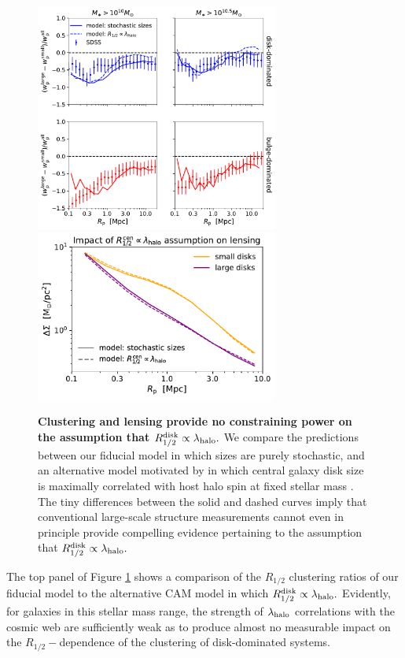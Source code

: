 \documentclass[usenatbib,usegraphicx,letterpaper]{mn2e}
\newcommand{\rhalf}{R_{1/2}}
\newcommand{\rhalfdisk}{R_{1/2}^{\rm disk}}
\newcommand{\halospin}{\lambda_{\rm halo}}
\begin{document}
\begin{figure}
\centering
\includegraphics[width=8cm]{FIGS/size_clustering_ratios_bt_decomposition_spin_size_correlation.pdf}
\includegraphics[width=8cm]{FIGS/central_lensing_spin_size_correlation.pdf}
\caption{
{\bf Clustering and lensing provide no constraining power on the assumption that $\rhalfdisk\propto\halospin.$}
We compare the predictions between our fiducial model in which sizes are purely stochastic, and an alternative model motivated by \citet{mo_mao_white98} in which central galaxy disk size is maximally correlated with host halo spin at fixed stellar mass \citep[implemented via conditional abundance matching, e.g.,][]{hearin_etal13b}. The tiny differences between the solid and dashed curves imply that conventional large-scale structure measurements cannot even in principle provide compelling evidence pertaining to the assumption that $\rhalfdisk\propto\halospin.$
}
\label{fig:halospin_lensing}
\end{figure}

The top panel of Figure \ref{fig:halospin_lensing} shows a comparison of the $\rhalf$ clustering ratios of our fiducial model to the alternative CAM model in which $\rhalfdisk\propto\halospin.$ Evidently, for galaxies in this stellar mass range, the strength of $\halospin$ correlations with the cosmic web are sufficiently weak as to produce almost no measurable impact on the $\rhalf-$dependence of the clustering of disk-dominated systems.
\end{document}
